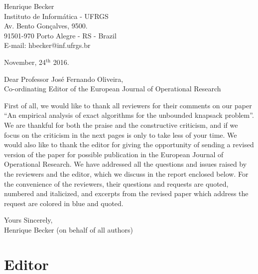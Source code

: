 \documentclass{elsarticle}
\begin{document}
\pagestyle{empty}

\vspace{2cm}

\begin{flushright}
   \begin{minipage}{7cm}
      Henrique Becker \\
      Instituto de Informática - UFRGS \\
      Av. Bento Gonçalves, 9500. \\
      91501-970 Porto Alegre - RS - Brazil \\
      E-mail: hbecker@inf.ufrgs.br \\
   \end{minipage}
\end{flushright}

\begin{flushleft}
November, 24$^{\text{th}}$ 2016.

\vspace{1.5cm}

Dear Professor José Fernando Oliveira, \\
Co-ordinating Editor of the European Journal of Operational Research
\end{flushleft}

\medskip
First of all, we would like to thank all reviewers for their comments on our paper ``An empirical analysis of exact algorithms for the unbounded knapsack problem''.
We are thankful for both the praise and the constructive criticism, and if we focus on the criticism in the next pages is only to take less of your time.
We would also like to thank the editor for giving the opportunity of sending a revised version of the paper for possible publication in the European Journal of Operational Research.
We have addressed all the questions and issues raised by the reviewers and the editor, which we discuss in the report enclosed below.
For the convenience of the reviewers, their questions and requests are quoted, numbered and italicized, and excerpts from the revised paper which address the request are colored in blue and quoted.

\medskip

\begin{flushleft}
Yours Sincerely,\\
Henrique Becker (on behalf of all authors)
\end{flushleft}

\newpage

\section{Editor}
\end{document}
